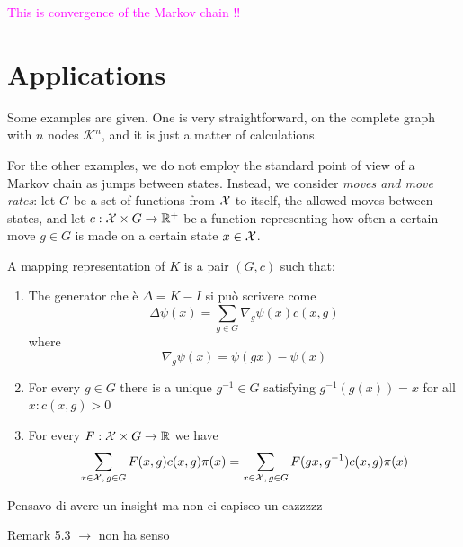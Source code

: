 \textcolor{magenta}{This is convergence of the Markov chain !! }
\section{Applications} \label{sec: hypercube}

Some examples are given. One is very straightforward, on the complete graph with $n$ nodes $\mathcal{K}^n$, and it is just a matter of calculations. 

For the other examples, we do not employ the standard point of view of a Markov chain as jumps between states. Instead, we consider \emph{moves and move rates}: let $G$ be a set of functions from $\mathcal{X}$ to itself, the allowed moves between states, and let $c:\mathcal{X} \times G\to \mathbb{R}^+$ be a function representing how often a certain move $g\in G$ is made on a certain state $x\in \mathcal{X}$.
\begin{definition}
    A mapping representation of $K$ is a pair $(G,c)$ such that:
    \begin{enumerate}
        \item The generator che %
        è $\Delta = K-I$ si può scrivere come 
        \[
        \Delta \psi(x) = \sum_{g \in G} \nabla_g\psi(x)c(x,g)
        \]
        where
        \[
        \nabla_g\psi(x)=\psi(gx)-\psi(x)
        \]
        \item For every $g\in G$ there is a unique $g^{-1}\in G$ satisfying $g^{-1}(g(x))=x$ for all $x : c(x,g)>0$
        \item For every $F:\mathcal{X}\times G \to \mathbb{R}$ we have
        \[
        \sum_{x\in\mathcal{X}, \, g\in G} F(x,g)c(x,g)\pi(x)= \sum_{x\in\mathcal{X}, \, g\in G} F(gx,g^{-1})c(x,g)\pi(x)
        \]
    \end{enumerate}
\end{definition}



Pensavo di avere un insight ma non ci capisco un cazzzzz

Remark 5.3 $\rightarrow$ non ha senso 

